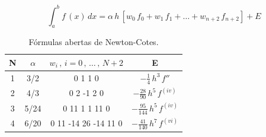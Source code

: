 \begin{enumerate}
\[
 \int_a^b f\,(x) \, dx = \alpha \, h \, \left[ w_0\,f_0 + w_1\,f_1 + \dots + w_{n+2}\,f_{n+2} \right] + E
\]

\begin{table}[htp]
\footnotesize
	\centering
		
		\begin{tabular}{|c|c|c|c|}
		\hline		
		\textbf{N} & \textbf{$\alpha$} & \textbf{$w_i\,,\,i=0\,,\,\ldots\,,\,N+2$} & \textbf{E} \\
		\hline \hline
		1 & 3/2 & 0 1 1 0 & $- \displaystyle \frac{1}{4} \, h^3 \, f''$ \\
		\hline 
		2 & 4/3 & 0 2 -1 2 0 & $- \displaystyle \frac{28}{90} \, h^5 \, f^{(iv)}$ \\
		\hline 
		3 & 5/24 & 0 11 1 1 11 0 & $- \displaystyle \frac{95}{144} \, h^5 \, f^{(iv)}$ \\
		\hline 
		4 & 6/20 & 0 11 -14 26 -14 11 0 & $- \displaystyle \frac{41}{140} \, h^7 \, f^{(vi)}$ \\
		\hline 
		\end{tabular}
	\caption{Fórmulas abertas de Newton-Cotes.}
	\label{cap2:sec5:tab1}
\end{table}

\end{enumerate}

